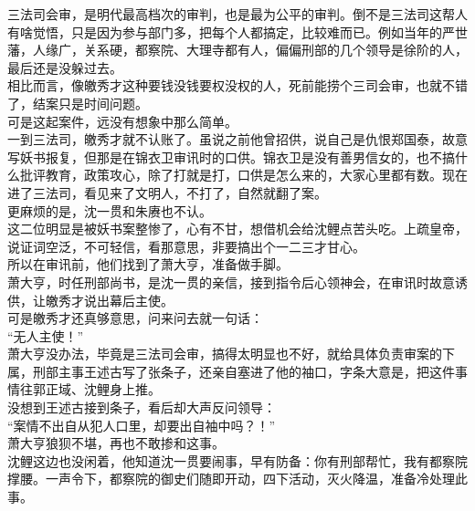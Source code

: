 \begin{multicols}{\theparacolNo}
三法司会审，是明代最高档次的审判，也是最为公平的审判。倒不是三法司这帮人有啥觉悟，只是因为参与部门多，把每个人都搞定，比较难而已。例如当年的严世藩，人缘广，关系硬，都察院、大理寺都有人，偏偏刑部的几个领导是徐阶的人，最后还是没躲过去。\\

相比而言，像皦秀才这种要钱没钱要权没权的人，死前能捞个三司会审，也就不错了，结案只是时间问题。\\

可是这起案件，远没有想象中那么简单。\\

一到三法司，皦秀才就不认账了。虽说之前他曾招供，说自己是仇恨郑国泰，故意写妖书报复，但那是在锦衣卫审讯时的口供。锦衣卫是没有善男信女的，也不搞什么批评教育，政策攻心，除了打就是打，口供是怎么来的，大家心里都有数。现在进了三法司，看见来了文明人，不打了，自然就翻了案。\\

更麻烦的是，沈一贯和朱赓也不认。\\

这二位明显是被妖书案整惨了，心有不甘，想借机会给沈鲤点苦头吃。上疏皇帝，说证词空泛，不可轻信，看那意思，非要搞出个一二三才甘心。\\

所以在审讯前，他们找到了萧大亨，准备做手脚。\\

萧大亨，时任刑部尚书，是沈一贯的亲信，接到指令后心领神会，在审讯时故意诱供，让皦秀才说出幕后主使。\\

可是皦秀才还真够意思，问来问去就一句话：\\

“无人主使！”\\

萧大亨没办法，毕竟是三法司会审，搞得太明显也不好，就给具体负责审案的下属，刑部主事王述古写了张条子，还亲自塞进了他的袖口，字条大意是，把这件事情往郭正域、沈鲤身上推。\\

没想到王述古接到条子，看后却大声反问领导：\\

“案情不出自从犯人口里，却要出自袖中吗？！”\\

萧大亨狼狈不堪，再也不敢掺和这事。\\

沈鲤这边也没闲着，他知道沈一贯要闹事，早有防备：你有刑部帮忙，我有都察院撑腰。一声令下，都察院的御史们随即开动，四下活动，灭火降温，准备冷处理此事。\\


\end{multicols}
